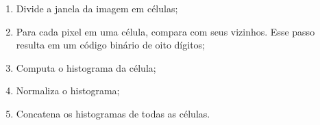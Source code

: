 \begin{description}
\begin{enumerate}
  \item Divide a janela da imagem em células;
  \item Para cada pixel em uma célula, compara com seus vizinhos. Esse passo resulta em um código binário de oito dígitos;
  \item Computa o histograma da célula;
  \item Normaliza o histograma;
  \item Concatena os histogramas de todas as células.
\end{enumerate}

\end{description}

%
%
